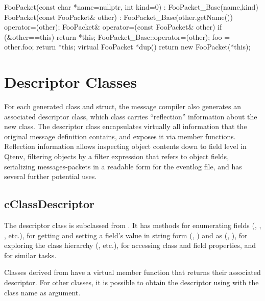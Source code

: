 \begin{cpp}
    FooPacket(const char *name=nullptr, int kind=0) : FooPacket_Base(name,kind) {
    }
    FooPacket(const FooPacket& other) : FooPacket_Base(other.getName()) {
        operator=(other);
    }
    FooPacket& operator=(const FooPacket& other) {
        if (&other==this) return *this;
        FooPacket_Base::operator=(other);
        foo = other.foo;
        return *this;
    }
    virtual FooPacket *dup() {
        return new FooPacket(*this);
    }
\end{cpp}


\section{Descriptor Classes}
\label{sec:msg-defs:descriptor-classes}

For each generated class and struct, the message compiler also generates an
associated descriptor class, which class carries ``reflection'' information
about the new class. The descriptor class encapsulates virtually all information
that the original message definition contains, and exposes it via member
functions. Reflection information allows inspecting object contents down to
field level in Qtenv, filtering objects by a filter expression that refers to
object fields, serializing messages-packets in a readable form for the eventlog
file, and has several further potential uses.


\subsection{cClassDescriptor}
\label{sec:msg-defs:cclassdescriptor}

The descriptor class is subclassed from . It has
methods for enumerating fields (, ,
, etc.), for getting and setting a field's value in
string form (, ) and as
 (, ), for
exploring the class hierarchy (, etc.), for
accessing class and field properties, and for similar tasks.

Classes derived from  have a virtual member function
 that returns their associated descriptor. For other
classes, it is possible to obtain the descriptor using
 with the class name as argument.

